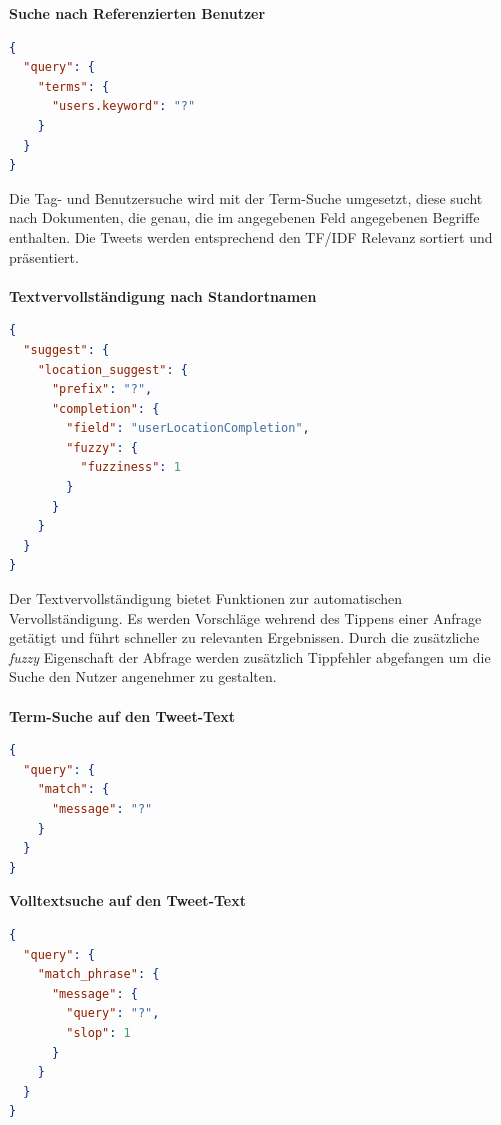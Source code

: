 \textbf{Suche nach Referenzierten Benutzer}
\begin{lstlisting}[language=json,firstnumber=1]
{
  "query": {
    "terms": {
      "users.keyword": "?"
    }
  }
}
\end{lstlisting}

Die Tag- und Benutzersuche wird mit der Term-Suche umgesetzt, diese sucht nach Dokumenten, die genau, die im angegebenen Feld angegebenen Begriffe enthalten. Die Tweets werden entsprechend den TF/IDF Relevanz sortiert und präsentiert.  
\\\\
\textbf{Textvervollständigung nach Standortnamen}
\begin{lstlisting}[language=json,firstnumber=1]
{
  "suggest": {
    "location_suggest": {
      "prefix": "?",
      "completion": {
        "field": "userLocationCompletion",
        "fuzzy": {
          "fuzziness": 1
        }
      }
    }
  }
}
\end{lstlisting}
Der Textvervollständigung bietet Funktionen zur automatischen Vervollständigung. Es werden Vorschläge wehrend des Tippens einer Anfrage getätigt und führt schneller zu relevanten Ergebnissen. Durch die zusätzliche \textit{fuzzy} Eigenschaft der Abfrage werden zusätzlich Tippfehler abgefangen um die Suche den Nutzer angenehmer zu gestalten.
\\\\
\textbf{Term-Suche auf den Tweet-Text}
\begin{lstlisting}[language=json,firstnumber=1]
{
  "query": {
    "match": {
      "message": "?"
    }
  }
}
\end{lstlisting}

\textbf{Volltextsuche auf den Tweet-Text}
\begin{lstlisting}[language=json,firstnumber=1]
{
  "query": {
    "match_phrase": {
      "message": {
        "query": "?",
        "slop": 1
      }
    }
  }
}
\end{lstlisting}

